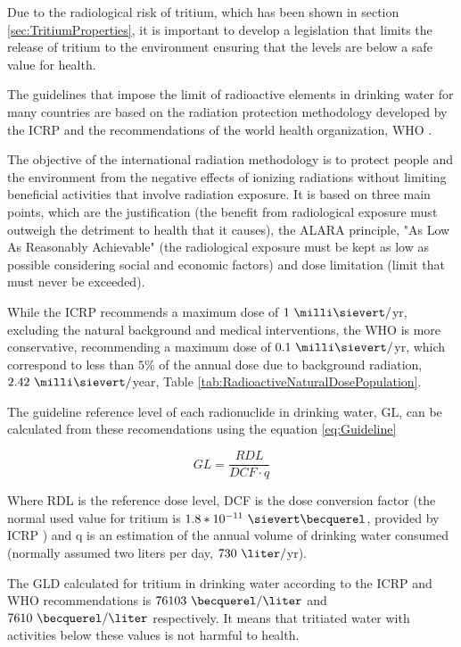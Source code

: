 Due to the radiological risk of tritium, which has been shown in section \ref{sec:TritiumProperties}, it is important to develop a legislation that limits the release of tritium to the environment ensuring that the levels are below a safe value for health.

The guidelines that impose the limit of radioactive elements in drinking water for many countries are based on the radiation protection methodology developed by the ICRP \cite{ICRP_GL} and the recommendations of the world health organization, WHO \cite{WHO_GL}.

The objective of the international radiation methodology is to  protect people and the environment from the negative effects of ionizing radiations without limiting beneficial activities that involve radiation exposure. It is based on three main points, which are the justification (the benefit from radiological exposure must outweigh the detriment to health that it causes), the ALARA principle, "As Low As Reasonably Achievable" (the radiological exposure must be kept as low as possible considering social and economic factors) and dose limitation (limit that must never be exceeded).

While the ICRP recommends a maximum dose of $1~\milli\sievert/$yr, excluding the natural background and medical interventions, the WHO is more conservative, recommending a maximum dose of $0.1~\milli\sievert/$yr, which correspond to less than $5\%$ of the annual dose due to background radiation, $2.42~\milli\sievert/$year, Table \ref{tab:RadioactiveNaturalDosePopulation}.

The guideline reference level of each radionuclide in drinking water, GL, can be calculated from these recomendations using the equation \ref{eq:Guideline}

\begin{equation}
GL = \frac{RDL}{DCF \cdot{} q}
\label{eq:Guideline}
\end{equation}

Where RDL is the reference dose level, DCF is the dose conversion factor (the normal used value for tritium is $1.8*10^{-11}~\sievert\becquerel$, provided by ICRP \cite{ICRP_factor}) and q is an estimation of the annual volume of drinking water consumed (normally assumed two liters per day, $730~\liter/$yr).

The GLD calculated for tritium in drinking water according to the ICRP and WHO recommendations is $76103~\becquerel/\liter$ and $7610~\becquerel/\liter$  respectively. It means that tritiated water with activities below these values is not harmful to health.

